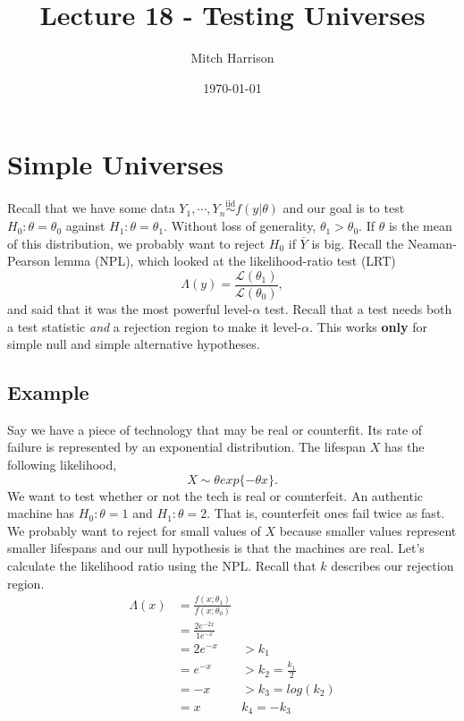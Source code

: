 \documentclass[titlepage, 12pt, leqno]{article}
\title{\Huge{Lecture 18 - Testing Universes}}
\author{\large{Mitch Harrison}}
\date{\today}
\begin{document}
\setlength{\parskip}{1\baselineskip}
\setlength{\parindent}{15pt}
\maketitle
\tableofcontents
\newpage


\section{Simple Universes}

Recall that we have some data $Y_{1}, \cdots ,Y_{n} \overset{\mathrm{iid}}{\sim}
f(y|\theta)$ and our goal is to test $H_{0}:\theta = \theta_{0}$ against
$H_{1}:\theta = \theta_{1}$. Without loss of generality, $\theta_{1} >
\theta_{0}$. If $\theta$ is the mean of this distribution, we probably want to
reject $H_{0}$ if $\bar Y$ is big. Recall the Neaman-Pearson lemma (NPL), which
looked at the likelihood-ratio test (LRT)
\[
    \Lambda(y) = \frac{\mathcal{L}(\theta_{1})}{\mathcal{L}(\theta_{0})},
\]
and said that it was the most powerful level-$\alpha$ test. Recall that a test
needs both a test statistic \textit{and} a rejection region to make it
level-$\alpha$. This works \textbf{only} for simple null and simple alternative
hypotheses.

\subsection{Example}
Say we have a piece of technology that may be real or counterfit. Its rate of
failure is represented by an exponential distribution. The lifespan $X$ has the
following likelihood,
\[
    X \sim \theta exp\{-\theta x\}.
\]
We want to test whether or not the tech is real or counterfeit. An authentic
machine has $H_{0}:\theta = 1$ and $H_{1}:\theta = 2$. That is, counterfeit ones
fail twice as fast. We probably want to reject for small values of $X$ because
smaller values represent smaller lifespans and our null hypothesis is that the
machines are real. Let's calculate the likelihood ratio using the NPL. Recall
that $k$ describes our rejection region.
\begin{align*}
    \Lambda(x)
    &= \frac{f(x;\theta_{1})}{f(x;\theta_{0})} \\
    &= \frac{2e^{-2x}}{1e^{-x}}\\
    &= 2e^{-x} & > k_{1}\\
    &= e^{-x} & > k_{2}=\frac{k_{1}}{2} \\
    &= -x & > k_{3} = log(k_{2}) \\
    &= x & k_{4} = -k_{3}
\end{align*}
\end{document}
